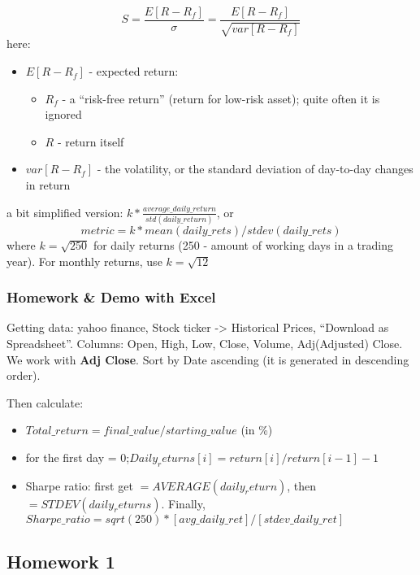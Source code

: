 \documentclass{scrartcl}
\begin{document}
$$S = \frac{E[R-R_f]}{\sigma} = \frac{E[R-R_f]}{\sqrt{var[R-R_f]}} $$
here:
\begin{itemize}
\item $E[R - R_f]$ - expected return:
  \begin{itemize}
  \item  $R_f$ - a ``risk-free return'' (return for low-risk asset); quite often
    it is ignored
  \item $R$ - return itself
  \end{itemize}
\item $var[R-R_f]$ - the volatility, or the standard deviation of day-to-day
  changes in return
\end{itemize}
a bit simplified version: $k *
\frac{average\_daily\_return}{std(daily\_return)}$, or 
$$ metric = k * mean(daily\_rets)/stdev(daily\_rets)$$
where $k = \sqrt{250}$ for daily returns (250 - amount of working days in a
trading year). For monthly returns, use $k = \sqrt{12}$

\subsubsection{Homework \& Demo with Excel}
\label{sec:Excel}
Getting data: yahoo finance, Stock ticker -> Historical Prices, ``Download as
Spreadsheet''. 
Columns: Open, High, Low, Close, Volume, Adj(Adjusted) Close. We work with {\bf
  Adj Close}. Sort by Date ascending (it is generated in descending order).

Then calculate:
\begin{itemize}
\item $Total\_return=final\_value/starting\_value$ (in \%)
\item for the first day = 0;$Daily_returns[i] = return[i]/return[i-1] - 1$ 
\item Sharpe ratio: first get $=AVERAGE(daily_return)$, then
  $=STDEV(daily_returns)$. Finally,
  $Sharpe\_ratio=sqrt(250)*[avg\_daily\_ret]/[stdev\_daily\_ret]$ 
\end{itemize}

\subsection{Homework 1}
\label{sec:Homework1}
\end{document}
